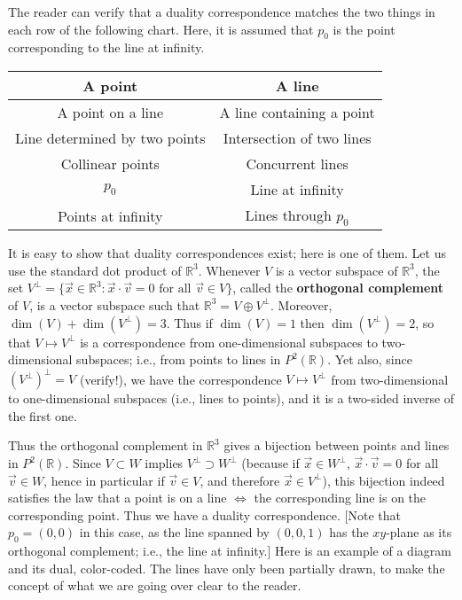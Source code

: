 \documentclass[leqno]{book}
\begin{document}
The reader can verify that a duality correspondence matches the two things in each row of the following chart.  Here, it is assumed that $p_0$ is the point corresponding to the line at infinity.
\begin{center}
\begin{tabular}{c|c}
A point&A line\\\hline
A point on a line&A line containing a point\\\hline
Line determined by two points&Intersection of two lines\\\hline
Collinear points&Concurrent lines\\\hline
$p_0$&Line at infinity\\\hline
Points at infinity&Lines through $p_0$
\end{tabular}
\end{center}
It is easy to show that duality correspondences exist; here is one of them.  Let us use the standard dot product of $\mathbb R^3$.  Whenever $V$ is a vector subspace of $\mathbb R^3$, the set $V^\perp=\{\vec x\in\mathbb R^3:\vec x\cdot\vec v=0\text{ for all }\vec v\in V\}$, called the \textbf{orthogonal complement} of $V$, is a vector subspace such that $\mathbb R^3=V\oplus V^\perp$.  Moreover, $\dim(V)+\dim(V^\perp)=3$.  Thus if $\dim(V)=1$ then $\dim(V^\perp)=2$, so that $V\mapsto V^\perp$ is a correspondence from one-dimensional subspaces to two-dimensional subspaces; i.e., from points to lines in $P^2(\mathbb R)$.  Yet also, since $(V^\perp)^\perp=V$ (verify!), we have the correspondence $V\mapsto V^\perp$ from two-dimensional to one-dimensional subspaces (i.e., lines to points), and it is a two-sided inverse of the first one.

Thus the orthogonal complement in $\mathbb R^3$ gives a bijection between points and lines in $P^2(\mathbb R)$.  Since $V\subset W$ implies $ V^\perp\supset W^\perp$ (because if $\vec x\in W^\perp$, $\vec x\cdot\vec v=0$ for all $\vec v\in W$, hence in particular if $\vec v\in V$, and therefore $\vec x\in V^\perp$), this bijection indeed satisfies the law that a point is on a line $\iff$ the corresponding line is on the corresponding point.  Thus we have a duality correspondence.  [Note that $p_0=(0,0)$ in this case, as the line spanned by $(0,0,1)$ has the $xy$-plane as its orthogonal complement; i.e., the line at infinity.]  Here is an example of a diagram and its dual, color-coded.  The lines have only been partially drawn, to make the concept of what we are going over clear to the reader.
\end{document}

